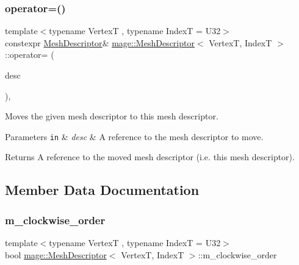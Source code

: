 \subsubsection{\texorpdfstring{operator=()}{operator=()}\hspace{0.1cm}{\footnotesize\ttfamily [2/2]}}
{\footnotesize\ttfamily template$<$typename VertexT , typename IndexT  = U32$>$ \\
constexpr \hyperlink{structmage_1_1_mesh_descriptor}{Mesh\+Descriptor}\& \hyperlink{structmage_1_1_mesh_descriptor}{mage\+::\+Mesh\+Descriptor}$<$ VertexT, IndexT $>$\+::operator= (\begin{DoxyParamCaption}\item[{\hyperlink{structmage_1_1_mesh_descriptor}{Mesh\+Descriptor}$<$ VertexT, IndexT $>$ \&\&}]{desc }\end{DoxyParamCaption})\hspace{0.3cm}{\ttfamily [default]}, {\ttfamily [noexcept]}}

Moves the given mesh descriptor to this mesh descriptor.


\begin{DoxyParams}[1]{Parameters}
\mbox{\tt in}  & {\em desc} & A reference to the mesh descriptor to move. \\
\hline
\end{DoxyParams}
\begin{DoxyReturn}{Returns}
A reference to the moved mesh descriptor (i.\+e. this mesh descriptor). 
\end{DoxyReturn}


\subsection{Member Data Documentation}
\hypertarget{structmage_1_1_mesh_descriptor_aa64fd6421b27729a6b27ad0c2b70af1e}{}\label{structmage_1_1_mesh_descriptor_aa64fd6421b27729a6b27ad0c2b70af1e} 
\subsubsection{\texorpdfstring{m\+\_\+clockwise\+\_\+order}{m\_clockwise\_order}}
{\footnotesize\ttfamily template$<$typename VertexT , typename IndexT  = U32$>$ \\
bool \hyperlink{structmage_1_1_mesh_descriptor}{mage\+::\+Mesh\+Descriptor}$<$ VertexT, IndexT $>$\+::m\+\_\+clockwise\+\_\+order\hspace{0.3cm}{\ttfamily [private]}}

